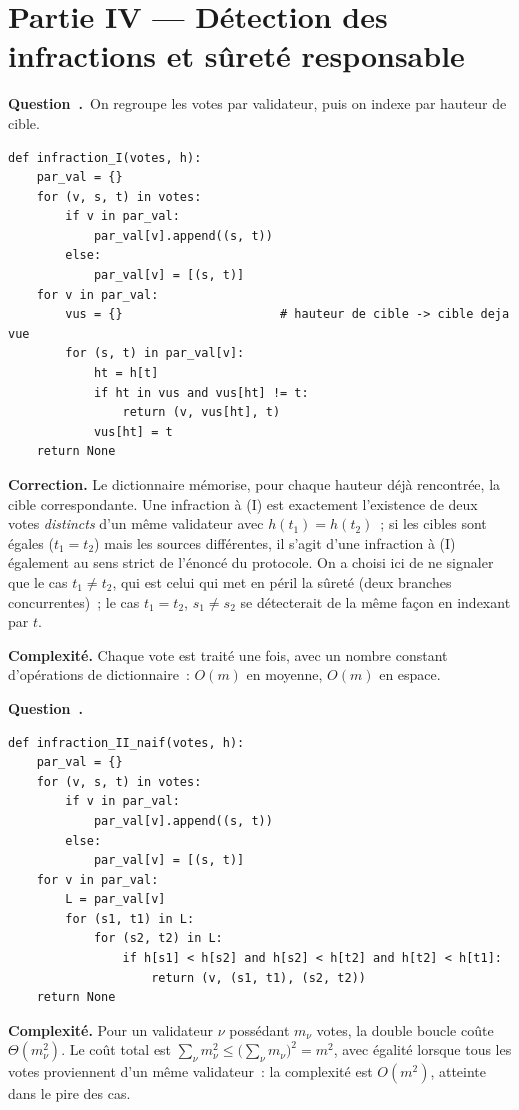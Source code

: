 \documentclass[11pt,a4paper]{article}
\renewcommand{\Q}{\medskip\par\stepcounter{qcnt}\noindent\textbf{\color{cnc}Question~\theqcnt.}~}
\begin{document}
\section*{Partie IV --- Détection des infractions et sûreté responsable}

\Q On regroupe les votes par validateur, puis on indexe par hauteur de cible.
\begin{lstlisting}
def infraction_I(votes, h):
    par_val = {}
    for (v, s, t) in votes:
        if v in par_val:
            par_val[v].append((s, t))
        else:
            par_val[v] = [(s, t)]
    for v in par_val:
        vus = {}                      # hauteur de cible -> cible deja vue
        for (s, t) in par_val[v]:
            ht = h[t]
            if ht in vus and vus[ht] != t:
                return (v, vus[ht], t)
            vus[ht] = t
    return None
\end{lstlisting}
\textbf{Correction.} Le dictionnaire  mémorise, pour chaque hauteur déjà
rencontrée, la cible correspondante. Une infraction à (I) est exactement l'existence de deux
votes \emph{distincts} d'un même validateur avec $h(t_1)=h(t_2)$~; si les cibles sont égales
($t_1=t_2$) mais les sources différentes, il s'agit d'une infraction à (I) également au sens
strict de l'énoncé du protocole. On a choisi ici de ne signaler que le cas $t_1\ne t_2$, qui
est celui qui met en péril la sûreté (deux branches concurrentes)~; le cas $t_1=t_2$,
$s_1\ne s_2$ se détecterait de la même façon en indexant par $t$.

\textbf{Complexité.} Chaque vote est traité une fois, avec un nombre constant d'opérations de
dictionnaire~: $O(m)$ en moyenne, $O(m)$ en espace.

\Q
\begin{lstlisting}
def infraction_II_naif(votes, h):
    par_val = {}
    for (v, s, t) in votes:
        if v in par_val:
            par_val[v].append((s, t))
        else:
            par_val[v] = [(s, t)]
    for v in par_val:
        L = par_val[v]
        for (s1, t1) in L:
            for (s2, t2) in L:
                if h[s1] < h[s2] and h[s2] < h[t2] and h[t2] < h[t1]:
                    return (v, (s1, t1), (s2, t2))
    return None
\end{lstlisting}
\textbf{Complexité.} Pour un validateur $\nu$ possédant $m_\nu$ votes, la double boucle coûte
$\Theta(m_\nu^2)$. Le coût total est $\sum_\nu m_\nu^2 \le \big(\sum_\nu m_\nu\big)^2 = m^2$,
avec égalité lorsque tous les votes proviennent d'un même validateur~: la complexité est
$O(m^2)$, atteinte dans le pire des cas.
\end{document}
